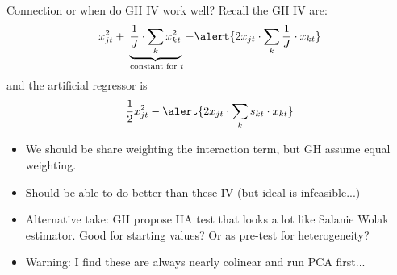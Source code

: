 \documentclass[aspectratio=169,10pt]{beamer}
\begin{document}
\begin{frame}{Connection or when do GH IV work well?}
Recall the GH IV are:
\begin{align*}
x_{jt}^2 + \underbrace{\frac{1}{J} \cdot \sum_k x_{kt}^2}_{\text{ constant for } t } - \alert{2 x_{jt}  \cdot \sum_k  \frac{1}{J} \cdot x_{kt}}
\end{align*}
and the artificial regressor is
\begin{align*}
\frac{1}{2} x_{jt}^2 - \alert{2 x_{jt} \cdot \sum_k s_{kt}  \cdot x_{kt}}
\end{align*}
\begin{itemize}
\item We should be \alert{share weighting} the interaction term, but GH assume equal weighting.\\
\item Should be able to do better than these IV (but ideal is infeasible...)
\item Alternative take: GH propose IIA test that looks a lot like Salanie Wolak estimator. Good for starting values? Or as pre-test for heterogeneity?
\item Warning: I find these are always nearly colinear and run PCA first...
\end{itemize}
\end{frame}







\end{document}
